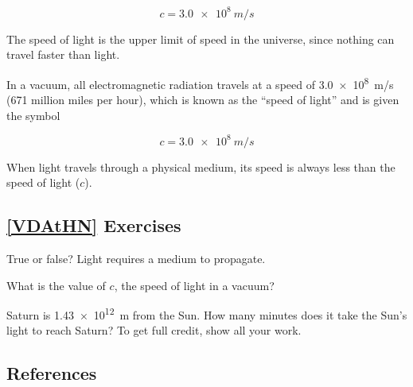 \documentclass[main.tex]{subfiles}
\begin{document}
\begin{equation}
    c = \SI{3.0e8}{m/s}
\end{equation}

The speed of light is the upper limit of speed in the universe, since nothing can travel faster than light.

In a vacuum, all electromagnetic radiation travels at a speed of \SI{3.0e8}{m/s} (671 million miles per hour), which is known as the ``speed of light'' and is given the symbol

\begin{equation*}
    c = \SI{3.0e8}{m/s}
\end{equation*}

When light travels through a physical medium, its speed is always less than the speed of light ($c$).

\subsection*{\ref{VDAtHN} Exercises}

\begin{exercise}
    True or false? Light requires a medium to propagate.
\end{exercise}

\begin{exercise}
    What is the value of $c$, the speed of light in a vacuum?
\end{exercise}

\begin{exercise}
    Saturn is \SI{1.43e12}{m} from the Sun. How many minutes does it take the Sun’s light to reach Saturn? To get full credit, show all your work.
\end{exercise}

\clearpage
\subsection*{References}
\end{document}

